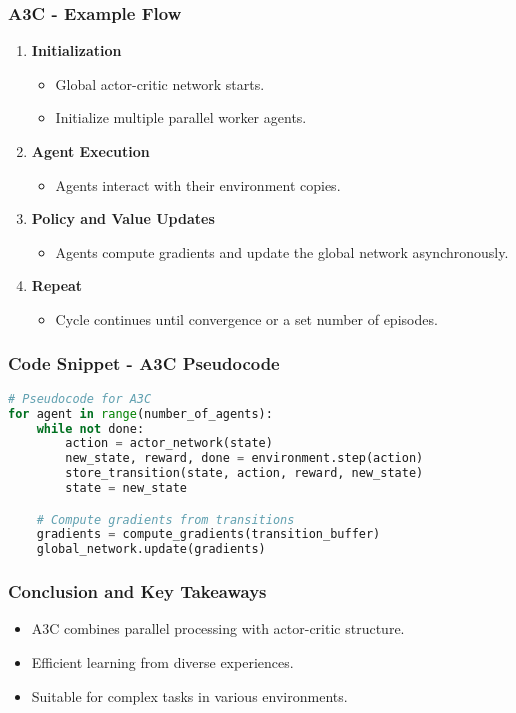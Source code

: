 \documentclass{beamer}
\begin{document}
\begin{frame}[fragile]
    \frametitle{A3C - Example Flow}
    \begin{enumerate}
        \item \textbf{Initialization}
            \begin{itemize}
                \item Global actor-critic network starts.
                \item Initialize multiple parallel worker agents.
            \end{itemize}
        \item \textbf{Agent Execution}
            \begin{itemize}
                \item Agents interact with their environment copies.
            \end{itemize}
        \item \textbf{Policy and Value Updates}
            \begin{itemize}
                \item Agents compute gradients and update the global network asynchronously.
            \end{itemize}
        \item \textbf{Repeat}
            \begin{itemize}
                \item Cycle continues until convergence or a set number of episodes.
            \end{itemize}
    \end{enumerate}
\end{frame}

\begin{frame}[fragile]
    \frametitle{Code Snippet - A3C Pseudocode}
    \begin{lstlisting}[language=Python]
# Pseudocode for A3C
for agent in range(number_of_agents):
    while not done:
        action = actor_network(state)
        new_state, reward, done = environment.step(action)
        store_transition(state, action, reward, new_state)
        state = new_state

    # Compute gradients from transitions
    gradients = compute_gradients(transition_buffer)
    global_network.update(gradients) 
    \end{lstlisting}
\end{frame}

\begin{frame}[fragile]
    \frametitle{Conclusion and Key Takeaways}
    \begin{itemize}
        \item A3C combines parallel processing with actor-critic structure.
        \item Efficient learning from diverse experiences.
        \item Suitable for complex tasks in various environments.
    \end{itemize}
\end{frame}
\end{document}
